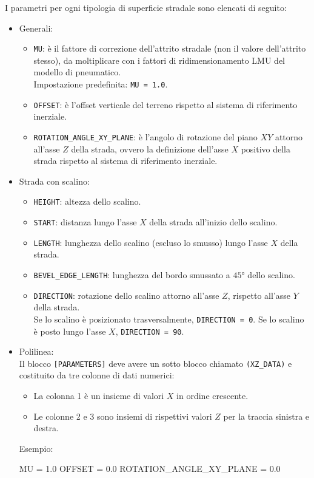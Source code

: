I parametri per ogni tipologia di superficie stradale sono elencati di seguito:
\begin{itemize}
	\item Generali:
	\begin{itemize}
		\item \texttt{MU}: è il fattore di correzione dell'attrito stradale (non il valore dell'attrito stesso), da moltiplicare con i fattori di ridimensionamento LMU del modello di pneumatico.\\
		Impostazione predefinita: \texttt{MU = 1.0}.
		\item \texttt{OFFSET}: è l'offset verticale del terreno rispetto al sistema di riferimento inerziale.
		\item \texttt{ROTATION\_ANGLE\_XY\_PLANE}: è l'angolo di rotazione del piano $XY$ attorno all'asse $Z$ della strada, ovvero la definizione dell'asse $X$ positivo della strada rispetto al sistema di riferimento inerziale.
	\end{itemize}
	\item Strada con scalino:
	\begin{itemize}
		\item \texttt{HEIGHT}: altezza dello scalino.
		\item \texttt{START}: distanza lungo l'asse $X$ della strada all'inizio dello scalino.
		\item \texttt{LENGTH}: lunghezza dello scalino (escluso lo smusso) lungo l'asse $X$ della strada.
		\item \texttt{BEVEL\_EDGE\_LENGTH}: lunghezza del bordo smussato a $45°$ dello scalino.
		\item \texttt{DIRECTION}: rotazione dello scalino attorno all'asse $Z$, rispetto all'asse $Y$ della strada.\\
		Se lo scalino è posizionato trasversalmente, \texttt{DIRECTION = 0}. Se lo scalino è posto lungo l'asse $X$, \texttt{DIRECTION = 90}.
	\end{itemize}
	\item Polilinea:\\
	Il blocco \texttt{[PARAMETERS]} deve avere un sotto blocco chiamato \texttt{(XZ\_DATA)} e costituito da tre colonne di dati numerici:
	\begin{itemize}
		\item La colonna 1 è un insieme di valori $X$ in ordine crescente.
		\item Le colonne 2 e 3 sono insiemi di rispettivi valori $Z$ per la traccia sinistra e destra.
	\end{itemize}
	Esempio:
	\begin{pseudoc}
	[PARAMETERS]
	MU = 1.0
	OFFSET = 0.0
	ROTATION_ANGLE_XY_PLANE = 0.0 
	

\end{pseudoc}
\end{itemize}
